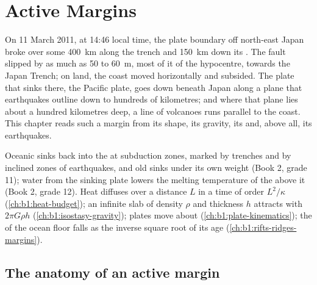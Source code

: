 \chapter{Active Margins}\label{ch:b1:active-margins}

On 11 March 2011, at 14:46 local time, the plate boundary off north-east Japan
broke over some \qty{400}{km} along the trench and \qty{150}{km} down its .
The fault slipped by as much as 50 to \qty{60}{m}, most of it  of the
hypocentre, towards the Japan Trench; on land, the coast moved horizontally and
subsided. The plate that sinks there, the Pacific plate, goes down beneath
Japan along a plane that earthquakes outline down to hundreds of kilometres;
and where that plane lies about a hundred kilometres deep, a line of volcanoes
runs parallel to the coast. This chapter reads such a margin from its shape,
its gravity, its  and, above all, its earthquakes.

\begin{recall}
Oceanic  sinks back into the  at subduction zones, marked by
trenches and by inclined zones of earthquakes, and old  sinks under
its own weight (Book 2, grade 11); water from the sinking plate lowers the
melting temperature of the  above it (Book 2, grade 12). Heat diffuses
over a distance $L$ in a time of order $L^2/\kappa$ (\cref{ch:b1:heat-budget});
an infinite slab of density $\rho$ and thickness $h$ attracts with $2\pi G\rho h$
(\cref{ch:b1:isostasy-gravity}); plates move about 
(\cref{ch:b1:plate-kinematics}); the  of the ocean floor falls as the
inverse square root of its age (\cref{ch:b1:rifts-ridges-margins}).
\end{recall}

\section{The anatomy of an active margin}\label{sec:b1:active-margins:anatomy}

